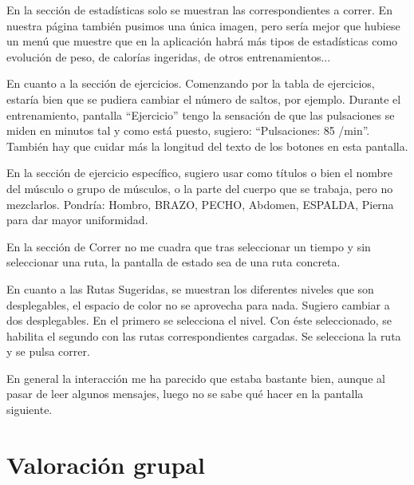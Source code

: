 \documentclass[a4paper]{article}
\begin{document}
En la sección de estadísticas solo se muestran las correspondientes a correr. En nuestra página también pusimos una única imagen, pero sería mejor que hubiese un menú que muestre que en la aplicación habrá más tipos de estadísticas como evolución de peso, de calorías ingeridas, de otros entrenamientos...

En cuanto a la sección de ejercicios. Comenzando por la tabla de ejercicios, estaría bien que se pudiera cambiar el número de saltos, por ejemplo. Durante el entrenamiento, pantalla ``Ejercicio'' tengo la sensación de que las pulsaciones se miden en minutos tal y como está puesto, sugiero: ``Pulsaciones: 85 /min''. También hay que cuidar más la longitud del texto de los botones en esta pantalla.

En la sección de ejercicio específico, sugiero usar como títulos o bien el nombre del músculo o grupo de músculos, o la parte del cuerpo que se trabaja, pero no mezclarlos. Pondría: Hombro, BRAZO, PECHO, Abdomen, ESPALDA, Pierna para dar mayor uniformidad.

En la sección de Correr no me cuadra que tras seleccionar un tiempo y sin seleccionar una ruta, la pantalla de estado sea de una ruta concreta.

En cuanto a las Rutas Sugeridas, se muestran los diferentes niveles que son desplegables, el espacio de color no se aprovecha para nada. Sugiero cambiar a dos desplegables. En el primero se selecciona el nivel. Con éste seleccionado, se habilita el segundo con las rutas correspondientes cargadas. Se selecciona la ruta y se pulsa correr.

En general la interacción me ha parecido que estaba bastante bien, aunque al pasar de leer algunos mensajes, luego no se sabe qué hacer en la pantalla siguiente.

\section{Valoración grupal}
 
\end{document}
